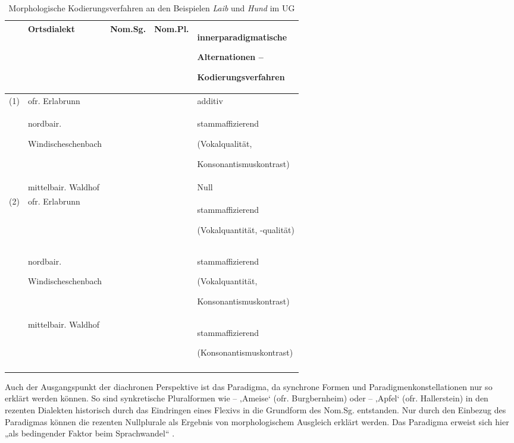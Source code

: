 \begin{table}
\begin{tabularx}{\textwidth}{l@{~~}>{\raggedright\arraybackslash}p{}llQ}
\lsptoprule
& Ortsdialekt & Nom.Sg. & Nom.Pl. & in\-ner\-pa\-ra\-dig\-ma\-ti\-sche

Alternationen --

Ko\-die\-rungs\-ver\-fah\-ren \\
\midrule
(1) & ofr. Erlabrunn &  &  & additiv\\
\tablevspace
& nordbair.

Win\-disch\-eschen\-bach &  &  & stammaffizierend

(Vokalqualität,

Kon\-so\-nan\-tis\-mus\-kon\-trast)\\
\tablevspace
& mittelbair. Wald\-hof &  &  & Null\\
\midrule
(2) & ofr. Erlabrunn &  &  & stammaffizierend

(Vokalquantität, {}-qualität)\\
\tablevspace
& nordbair.

Win\-disch\-eschen\-bach &   &  & stammaffizierend

(Vokalquantität,

Kon\-so\-nan\-tis\-mus\-kon\-trast)\\
\tablevspace
& mittelbair. Wald\-hof &   &  & stammaffizierend

(Kon\-so\-nan\-tis\-mus\-kon\-trast)\\
\lspbottomrule
\end{tabularx}
\caption{Morphologische Kodierungsverfahren an den Beispielen \textit{Laib} und \textit{Hund} im UG\label{tab:15}}
\end{table}

Auch der Ausgangspunkt der diachronen Perspektive ist das Paradigma, da synchrone Formen und Paradigmenkonstellationen nur so erklärt werden können. So sind synkretische Pluralformen wie  --  ‚Ameise‘ (ofr. Burgbernheim) oder   --  ‚Apfel‘ (ofr. Hallerstein) in den rezenten Dialekten historisch durch das Eindringen eines Flexivs in die Grundform des Nom.Sg. entstanden. Nur durch den Einbezug des Paradigmas können die rezenten Nullplurale als Ergebnis von morphologischem Ausgleich erklärt werden. Das Paradigma erweist sich hier „als bedingender Faktor beim Sprachwandel“ \citep[25]{Rowley1997}.

